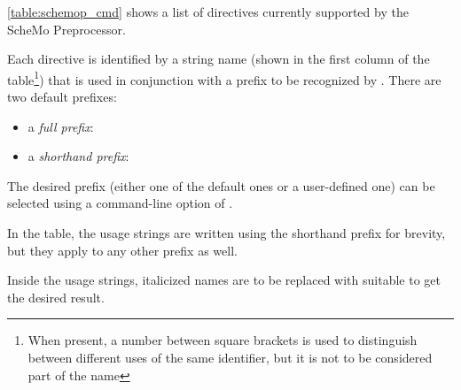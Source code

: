 \autoref{table:schemop_cmd} shows a list of directives currently
supported by the ScheMo Preprocessor.

Each directive is identified by a string name (shown in the first
column of the table\footnote{When present, a number between square
brackets is used to distinguish between different uses of the same
identifier, but it is not to be considered part of the name}) that is
used in conjunction with a prefix to be recognized by .
There are two default prefixes:
\begin{itemize}
  \item a \textit{full prefix}: 
  \item a \textit{shorthand prefix}: 
\end{itemize}

The desired prefix (either one of the default ones or a user-defined
one) can be selected using a command-line option of .

In the table, the usage strings are written using the shorthand
prefix for brevity, but they apply to any other prefix as well.

Inside the usage strings, italicized names are to be replaced with
suitable to get the desired result. 

